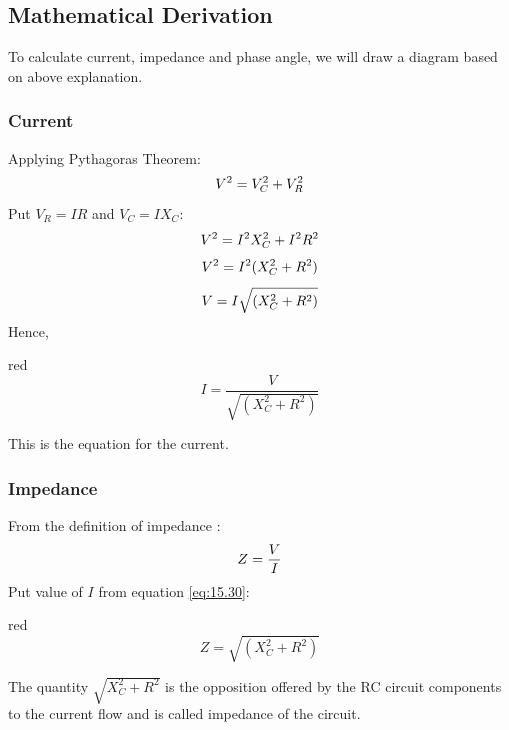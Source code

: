 \subsection*{Mathematical Derivation}
To calculate current, impedance and phase angle, we will draw a diagram
based on above explanation.
\subsubsection{Current}
Applying Pythagoras Theorem:
\begin{equation}\notag
    V^{2}=V_{C}^{2} + V_{R}^{2}
\end{equation}
Put $V_{R}= IR$ and $V_{C}=IX_{C}$:
\begin{equation}\notag
    V^{2}=I^{2}X_{C}^{2} + I^{2}R^{2}
\end{equation}
\begin{equation}\notag
    V^{2}=I^{2} (X_{C}^{2} + R^{2})
\end{equation}
\begin{equation}\notag
    V=I \sqrt{ (X_{C}^{2} + R^{2})}
\end{equation}
Hence,
\begin{mybox}{red}{}
\begin{equation}\label{eq:15.30}
    I=\frac{V}{\sqrt{ (X_{C}^{2} + R^{2})}}
\end{equation}
\end{mybox}
This is the equation for the current.
\subsubsection{Impedance}
From the definition of impedance :
\begin{equation}\notag
    Z = \frac{V}{I}
\end{equation}
Put value of $I$ from equation \ref{eq:15.30}:
\begin{mybox}{red}{}
\begin{equation}\label{eq:15.31}
    Z = \sqrt{ (X_{C}^{2} + R^{2})}
\end{equation}
\end{mybox}
The quantity $\sqrt{X_{C}^{2} + R^{2}}$ is the opposition offered by
the RC circuit components to the current flow and is called impedance
of the circuit.
